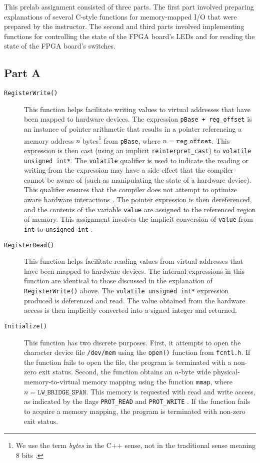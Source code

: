 \documentclass[11pt, letterpaper]{article} %
\begin{document}
This prelab assignment consisted of three parts. The first part involved preparing explanations of several C-style functions for memory-mapped I/O that were prepared by the instructor. The second and third parts involved implementing functions for controlling the state of the FPGA board's LEDs and for reading the state of the FPGA board's switches. 


\subsection*{Part A}

\begin{description}
    \item[\texttt{RegisterWrite()}] This function helps facilitate writing values to virtual addresses that have been mapped to hardware devices. The expression \texttt{pBase + reg\_offset} is an instance of pointer arithmetic that results in a pointer referencing a memory address $n$ bytes\footnote{We use the term \emph{bytes} in the C++ sense, not in the traditional sense meaning 8 bits \cite[\S4.4c1]{open-std-N4659}.} from \texttt{pBase}, where $n = \texttt{reg\_offset}$.  This expression is then cast (using an implicit \texttt{reinterpret\_cast}) to \texttt{volatile unsigned int*}. The \texttt{volatile} qualifier is used to indicate the reading or writing from the expression may have a side effect that the compiler cannot be aware of (such as manipulating the state of a hardware device). This qualifier ensures that the compiler does not attempt to optimize aware hardware interactions \cite[4.6c7.1]{open-std-N4659}. The pointer expression is then dereferenced, and the contents of the variable \texttt{value} are assigned to the referenced region of memory. This assignment involves the implicit conversion of \texttt{value} from \texttt{int} to  \texttt{unsigned int} \cite[7.8c2]{open-std-N4659}.
    
    \item[\texttt{RegisterRead()}] This function helps facilitate reading values from virtual addresses that have been mapped to hardware devices. The internal expressions in this function are identical to those discussed in the explanation of \texttt{RegisterWrite()} above. The \texttt{volatile unsigned int*} expression produced is deferenced and read. The value obtained from the hardware access is then implicitly converted into a signed integer and returned.
    
    \item[\texttt{Initialize()}] This function has two discrete purposes. First, it attempts to open the character device file \texttt{/dev/mem} \cite{man-dev-meme} using the \texttt{open()} function from \texttt{fcntl.h}. If the function fails to open the file, the program is terminated with a non-zero exit status. Second, the function obtains an $n$-byte wide physical-memory-to-virtual memory mapping using the function \texttt{mmap}, where $n=\texttt{LW\_BRIDGE\_SPAN}$. This memory is requested with read and write access, as indicated by the flags \texttt{PROT\_READ} and \texttt{PROT\_WRITE} \cite{man-mmap}. If the function fails to acquire a memory mapping, the program is terminated with non-zero exit status.
    

\end{description}
\end{document}
